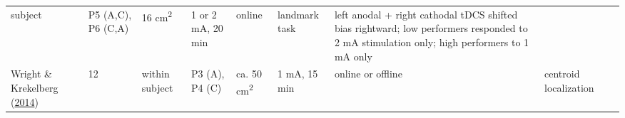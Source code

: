 \documentclass[11pt,]{memoir}
\begin{document}
\begin{longtable}[]{@{}lllllllll@{}}
\begin{minipage}[t]{0.04\columnwidth}
subject\strut
\end{minipage} & \begin{minipage}[t]{0.10\columnwidth}\raggedright
P5 (A,C), P6 (C,A)\strut
\end{minipage} & \begin{minipage}[t]{0.03\columnwidth}\raggedright
16
cm\textsuperscript{2}\strut
\end{minipage} & \begin{minipage}[t]{0.05\columnwidth}\raggedright
1 or 2 mA,
20 min\strut
\end{minipage} & \begin{minipage}[t]{0.04\columnwidth}\raggedright
online\strut
\end{minipage} & \begin{minipage}[t]{0.15\columnwidth}\raggedright
landmark task\strut
\end{minipage} & \begin{minipage}[t]{0.24\columnwidth}\raggedright
left anodal + right cathodal tDCS shifted bias rightward;
low performers responded to 2 mA stimulation only; high
performers to 1 mA only\strut
\end{minipage}\tabularnewline
\begin{minipage}[t]{0.09\columnwidth}\raggedright
Wright \& Krekelberg (\protect\hyperlink{ref-Wright2014}{2014})\strut
\end{minipage} & \begin{minipage}[t]{0.02\columnwidth}\raggedright
12\strut
\end{minipage} & \begin{minipage}[t]{0.04\columnwidth}\raggedright
within
subject\strut
\end{minipage} & \begin{minipage}[t]{0.10\columnwidth}\raggedright
P3 (A), P4 (C)\strut
\end{minipage} & \begin{minipage}[t]{0.03\columnwidth}\raggedright
ca.
50
cm\textsuperscript{2}\strut
\end{minipage} & \begin{minipage}[t]{0.05\columnwidth}\raggedright
1 mA, 15
min\strut
\end{minipage} & \begin{minipage}[t]{0.04\columnwidth}\raggedright
online
or
offline\strut
\end{minipage} & \begin{minipage}[t]{0.15\columnwidth}\raggedright
centroid localization\strut
\end{minipage} & \begin{minipage}[t]{0.24\columnwidth}\raggedright

\end{minipage}
\end{longtable}
\end{document}
